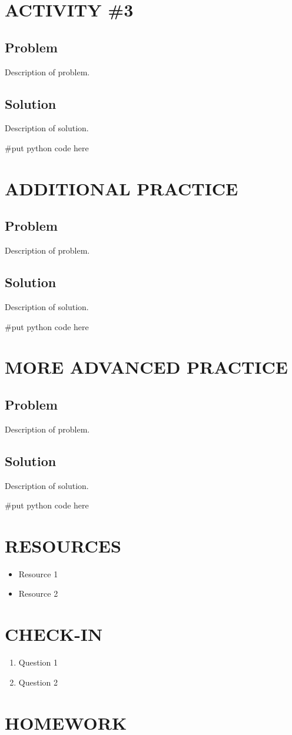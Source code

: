 \documentclass[14pt]{extreport}%
\begin{document}
\section*{ACTIVITY \#3} 
\subsection*{Problem}
Description of problem.
\subsection*{Solution}
Description of solution. \\
\begin{python}
#put python code here
\end{python}

\section*{ADDITIONAL PRACTICE} 
\subsection*{Problem}
Description of problem.
\subsection*{Solution}
Description of solution. \\
\begin{python}
#put python code here
\end{python}

\section*{MORE ADVANCED PRACTICE} 
\subsection*{Problem}
Description of problem.
\subsection*{Solution}
Description of solution. \\
\begin{python}
#put python code here
\end{python}

\section*{RESOURCES}
\begin{itemize}
    \item Resource 1
    \item Resource 2
\end{itemize}

\section*{CHECK-IN}
\begin{enumerate}
    \item Question 1
    \item Question 2
\end{enumerate}

\section*{HOMEWORK}
\end{document}
